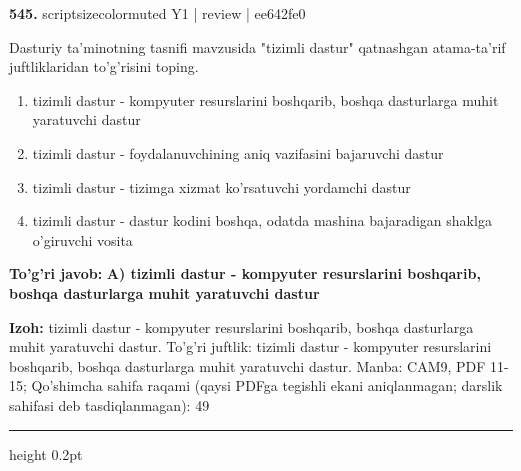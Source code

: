 \documentclass[10pt,a4paper]{article}
\begin{document}
{\bfseries\sffamily\color{ink} 545.} {scriptsizecolor{muted} Y1 | review | ee642fe0}
\par
Dasturiy ta'minotning tasnifi mavzusida "tizimli dastur" qatnashgan atama-ta'rif juftliklaridan to'g'risini toping.
\begin{enumerate}[label=\Alph*),leftmargin=9mm]
\item tizimli dastur - kompyuter resurslarini boshqarib, boshqa dasturlarga muhit yaratuvchi dastur
\item tizimli dastur - foydalanuvchining aniq vazifasini bajaruvchi dastur
\item tizimli dastur - tizimga xizmat ko'rsatuvchi yordamchi dastur
\item tizimli dastur - dastur kodini boshqa, odatda mashina bajaradigan shaklga o'giruvchi vosita
\end{enumerate}
\begin{tcolorbox}[enhanced,breakable,colback=teal!4,colframe=teal!60!black,boxrule=0.45pt,arc=1.2mm,left=2.7mm,right=2.7mm,top=1.8mm,bottom=1.8mm,before skip=2mm,after skip=2mm]
{\bfseries\sffamily\color{teal}To'g'ri javob:} \textbf{A) tizimli dastur - kompyuter resurslarini boshqarib, boshqa dasturlarga muhit yaratuvchi dastur}
\par\smallskip
{\bfseries Izoh:} tizimli dastur - kompyuter resurslarini boshqarib, boshqa dasturlarga muhit yaratuvchi dastur. To'g'ri juftlik: tizimli dastur - kompyuter resurslarini boshqarib, boshqa dasturlarga muhit yaratuvchi dastur. Manba: CAM9, PDF 11-15; Qo'shimcha sahifa raqami (qaysi PDFga tegishli ekani aniqlanmagan; darslik sahifasi deb tasdiqlanmagan): 49
\end{tcolorbox}
\vspace{2mm}\hrule height 0.2pt\vspace{3mm}
\end{document}
